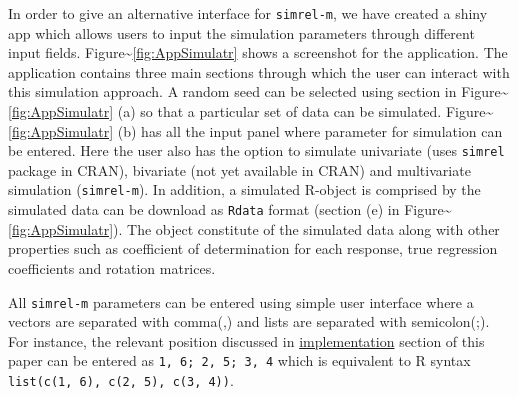 \documentclass[12pt,A4paper,authoryear]{elsarticle} %
\theoremstyle{definition}
\theoremstyle{definition}
\theoremstyle{remark}
\begin{document}
In order to give an alternative interface for \texttt{simrel-m}, we have
created a shiny app which allows users to input the simulation
parameters through different input fields.
Figure\textasciitilde{}\ref{fig:AppSimulatr} shows a screenshot for the
application. The application contains three main sections through which
the user can interact with this simulation approach. A random seed can
be selected using section in
Figure\textasciitilde{}\ref{fig:AppSimulatr} (a) so that a particular
set of data can be simulated.
Figure\textasciitilde{}\ref{fig:AppSimulatr} (b) has all the input panel
where parameter for simulation can be entered. Here the user also has
the option to simulate univariate (uses \texttt{simrel} package in
CRAN), bivariate (not yet available in CRAN) and multivariate simulation
(\texttt{simrel-m}). In addition, a simulated R-object is comprised by
the simulated data can be download as \texttt{Rdata} format (section (e)
in Figure\textasciitilde{}\ref{fig:AppSimulatr}). The object constitute
of the simulated data along with other properties such as coefficient of
determination for each response, true regression coefficients and
rotation matrices.

All \texttt{simrel-m} parameters can be entered using simple user
interface where a vectors are separated with comma(,) and lists are
separated with semicolon(;). For instance, the relevant position
discussed in \protect\hyperlink{implementation}{implementation} section
of this paper can be entered as \texttt{1,\ 6;\ 2,\ 5;\ 3,\ 4} which is
equivalent to R syntax \texttt{list(c(1,\ 6),\ c(2,\ 5),\ c(3,\ 4))}.
\end{document}
